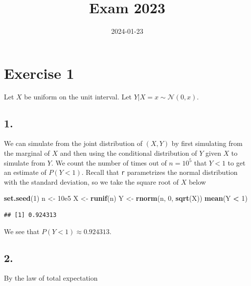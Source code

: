 \documentclass[
]{article}
\title{Exam 2023}
\author{}
\date{\vspace{-2.5em}2024-01-23}
\newenvironment{Shaded}{\begin{snugshade}}{\end{snugshade}}
\newcommand{\DecValTok}[1]{\textcolor[rgb]{0.00,0.00,0.81}{#1}}
\newcommand{\FloatTok}[1]{\textcolor[rgb]{0.00,0.00,0.81}{#1}}
\newcommand{\FunctionTok}[1]{\textcolor[rgb]{0.13,0.29,0.53}{\textbf{#1}}}
\newcommand{\NormalTok}[1]{#1}
\newcommand{\OtherTok}[1]{\textcolor[rgb]{0.56,0.35,0.01}{#1}}
\newcommand{\SpecialCharTok}[1]{\textcolor[rgb]{0.81,0.36,0.00}{\textbf{#1}}}
\begin{document}
\maketitle

\hypertarget{exercise-1}{%
\section{Exercise 1}\label{exercise-1}}

Let \(X\) be uniform on the unit interval. Let
\(Y | X = x \sim \mathcal{N}(0,x)\).

\hypertarget{section}{%
\subsection{1.}\label{section}}

We can simulate from the joint distribution of \((X,Y)\) by first
simulating from the marginal of \(X\) and then using the conditional
distribution of \(Y\) given \(X\) to simulate from \(Y\). We count the
number of times out of \(n = 10^5\) that \(Y < 1\) to get an estimate of
\(P(Y < 1)\). Recall that \texttt{r} parametrizes the normal
distribution with the standard deviation, so we take the square root of
\(X\) below

\begin{Shaded}
\begin{Highlighting}[]
\FunctionTok{set.seed}\NormalTok{(}\DecValTok{1}\NormalTok{)}
\NormalTok{n }\OtherTok{\textless{}{-}} \FloatTok{10e5}
\NormalTok{X }\OtherTok{\textless{}{-}} \FunctionTok{runif}\NormalTok{(n)}
\NormalTok{Y }\OtherTok{\textless{}{-}} \FunctionTok{rnorm}\NormalTok{(n, }\DecValTok{0}\NormalTok{, }\FunctionTok{sqrt}\NormalTok{(X))}
\FunctionTok{mean}\NormalTok{(Y }\SpecialCharTok{\textless{}} \DecValTok{1}\NormalTok{)}
\end{Highlighting}
\end{Shaded}

\begin{verbatim}
## [1] 0.924313
\end{verbatim}

We see that \(P(Y < 1) \approx 0.924313\).

\hypertarget{section-1}{%
\subsection{2.}\label{section-1}}

By the law of total expectation
\end{document}
